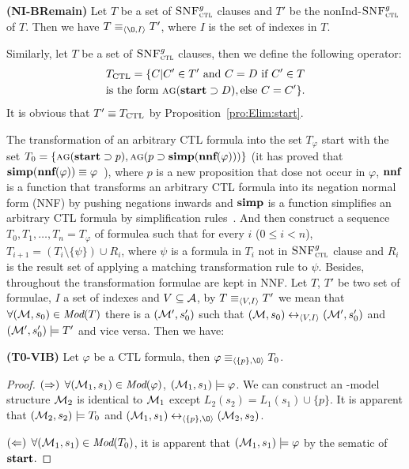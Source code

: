 \documentclass{article}
\begin{document}
\begin{lemma}\label{lem:No:Ind}
\textbf{(NI-BRemain)}
Let $T$ be a set of ${\textsc{SNF}_{\textsc{ctl}}^g}$ clauses and $T'$ be the nonInd-${\textsc{SNF}_{\textsc{ctl}}^g}$ of $T$.
Then we have $T \equiv_{\tuple{{\O}, I}} T'$,
where $I$ is the set of indexes in $T$.
\end{lemma}

Similarly, let $T$ be a set of ${\textsc{SNF}_{\textsc{ctl}}^g}$ clauses, then we define the following operator:
\begin{align*}
&T_{\textrm{CTL}} = \{C|C'\in T'\ \mbox{and}\ C = D \ \mbox{if}\ C' \in T\\
& \mbox{is the form}\ \textsc{a}\textsc{g}(\textbf{start}\supset D), \mbox{else}\ C= C'\}.
\end{align*}
It is obvious that $T' \equiv T_{\textrm{CTL}}$ by Proposition~\ref{pro:Elim:start}.



The transformation of an arbitrary CTL formula into the set $T_{\varphi}$ start with the set $T_0=\{\textsc{a} \textsc{g}(\textbf{start} \supset p), \textsc{a} \textsc{g}(p \supset \textbf{simp}(\textbf{nnf}(\varphi)))\}$ (it has proved that $\textbf{simp}(\textbf{nnf}(\varphi)) \equiv \varphi$~\cite{bolotov2000clausal}), where $p$ is a new proposition that dose not occur in $\varphi$, $\textbf{nnf}$ is a function that transforms an arbitrary CTL formula into its negation normal form (NNF) by pushing negations inwards and $\textbf{simp}$ is a function simplifies an arbitrary CTL formula by simplification rules~\cite{zhang2009refined}. And then construct a sequence $T_0, T_1,\dots, T_n=T_{\varphi}$ of formulea such that for every $i$ ($0 \leq i< n$), $T_{i+1} = (T_i \setminus \{\psi\}) \cup R_i$, where $\psi$ is a formula in $T_i$ not in ${\textsc{SNF}_{\textsc{ctl}}^g}$ clause and $R_i$ is the result set of applying a matching transformation rule to $\psi$. Besides, throughout the transformation formulae are kept in NNF.
Let $T$, $T'$ be two set of formulae, $I$ a set of indexes and $V\subseteq {\cal A}$, by $T\equiv_{{\langle{V, I}\rangle}} T'$ we mean that $\forall ({\cal M}, s_0) \in \textit{Mod}(T)$ there is a $({\cal M}', s_0')$ such that $({\cal M},s_0) \leftrightarrow_{{\langle{V, I}\rangle}} ({\cal M}',s_0')$ and $({\cal M}', s_0') \models T'$ and vice versa.
Then we have:

\begin{lemma}\label{lem:T_0}
\textbf{(T0-VIB)}
Let $\varphi$ be a CTL formula, then $\varphi \equiv_{\tuple{\{p\}, {\O}}} T_0$.
\end{lemma}
\begin{proof}
 $(\Rightarrow)$ $\forall ({\cal M}_1,s_1) \in \textit{Mod}(\varphi)$, \ie $({\cal M}_1,s_1) \models \varphi$. We can construct an \Ind-model structure ${\cal M}_2$ is identical to ${\cal M}_1$ except $L_2(s_2) = L_1(s_1) \cup \{p\}$. It is apparent that $({\cal M}_2,s_2) \models T_0$ and $(\Hm_1, s_1) \lrto_{\tuple{\{p\}, {\O}}} (\Hm_2, s_2)$.

 $(\Leftarrow)$ $\forall ({\cal M}_1,s_1) \in \textit{Mod}(T_0)$, it is apparent that $({\cal M}_1,s_1) \models \varphi$ by the sematic of $\textbf{start}$.
\end{proof}
\end{document}
